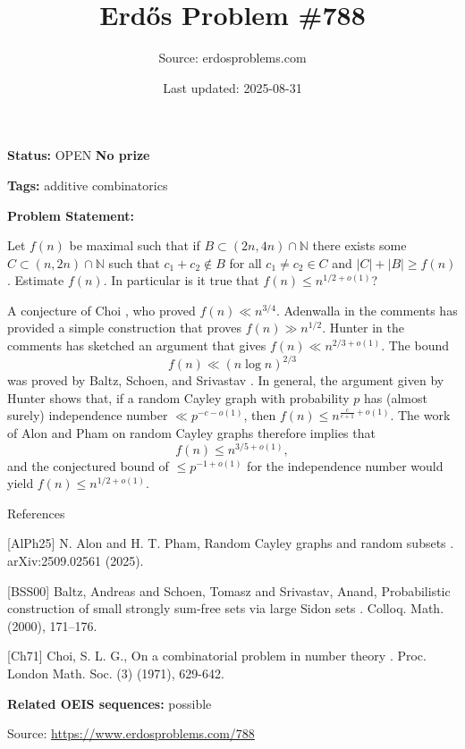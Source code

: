 \documentclass{article}
\title{Erd\H{o}s Problem \#788}
\date{Last updated: 2025-08-31}
\author{Source: erdosproblems.com}
\begin{document}
\maketitle

\noindent\textbf{Status:} OPEN \quad \textbf{No prize}

\noindent\textbf{Tags:} additive combinatorics

\medskip

\noindent\textbf{Problem Statement:}

Let $f(n)$ be maximal such that if $B\subset (2n,4n)\cap \mathbb{N}$ there exists some $C\subset (n,2n)\cap \mathbb{N}$ such that $c_1+c_2\not\in B$ for all $c_1\neq c_2\in C$ and $\lvert C\rvert+\lvert B\rvert \geq f(n)$. Estimate $f(n)$. In particular is it true that $f(n)\leq n^{1/2+o(1)}$?




A conjecture of Choi \cite{Ch71}, who proved $f(n) \ll n^{3/4}$. Adenwalla in the comments has provided a simple construction that proves $f(n) \gg n^{1/2}$. Hunter in the comments has sketched an argument that gives $f(n) \ll n^{2/3+o(1)}$. The bound\[f(n) \ll (n\log n)^{2/3}\]was proved by Baltz, Schoen, and Srivastav \cite{BSS00}. In general, the argument given by Hunter shows that, if a random Cayley graph with probability $p$ has (almost surely) independence number $\ll p^{-c-o(1)}$, then $f(n) \leq n^{\frac{c}{c+1}+o(1)}$. The work of Alon and Pham \cite{AlPh25} on random Cayley graphs therefore implies that\[f(n) \leq n^{3/5+o(1)},\]and the conjectured bound of $\leq p^{-1+o(1)}$ for the independence number would yield $f(n)\leq n^{1/2+o(1)}$.




References

[AlPh25] N. Alon and H. T. Pham, Random Cayley graphs and random subsets . arXiv:2509.02561 (2025).

[BSS00] Baltz, Andreas and Schoen, Tomasz and Srivastav, Anand, Probabilistic construction of small strongly sum-free sets via large Sidon sets . Colloq. Math. (2000), 171--176.

[Ch71] Choi, S. L. G., On a combinatorial problem in number theory . Proc. London Math. Soc. (3) (1971), 629-642.

\noindent\textbf{Related OEIS sequences:} possible


\bigskip
\noindent\small{Source: \url{https://www.erdosproblems.com/788}}
\end{document}
